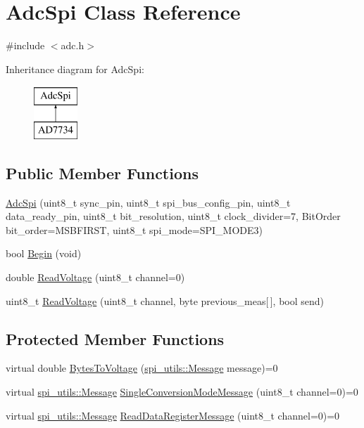 \hypertarget{classAdcSpi}{}\section{Adc\+Spi Class Reference}
\label{classAdcSpi}


{\ttfamily \#include $<$adc.\+h$>$}

Inheritance diagram for Adc\+Spi\+:\begin{figure}[H]
\begin{center}
\leavevmode
\includegraphics[height=2.000000cm]{classAdcSpi}
\end{center}
\end{figure}
\subsection*{Public Member Functions}
\begin{DoxyCompactItemize}
\item 
\mbox{\hyperlink{classAdcSpi_a3c66ca397c2a9d0a7c475ee551b3c388}{Adc\+Spi}} (uint8\+\_\+t sync\+\_\+pin, uint8\+\_\+t spi\+\_\+bus\+\_\+config\+\_\+pin, uint8\+\_\+t data\+\_\+ready\+\_\+pin, uint8\+\_\+t bit\+\_\+resolution, uint8\+\_\+t clock\+\_\+divider=7, Bit\+Order bit\+\_\+order=M\+S\+B\+F\+I\+R\+ST, uint8\+\_\+t spi\+\_\+mode=S\+P\+I\+\_\+\+M\+O\+D\+E3)
\item 
bool \mbox{\hyperlink{classAdcSpi_aa8f8f27578dd85cfcdbc9439bbce66cb}{Begin}} (void)
\item 
double \mbox{\hyperlink{classAdcSpi_ace8264acfedb357986afa5f611eff3ee}{Read\+Voltage}} (uint8\+\_\+t channel=0)
\item 
uint8\+\_\+t \mbox{\hyperlink{classAdcSpi_ac9d2ab924ad4de5b91713a22189f2ad0}{Read\+Voltage}} (uint8\+\_\+t channel, byte previous\+\_\+meas\mbox{[}$\,$\mbox{]}, bool send)
\end{DoxyCompactItemize}
\subsection*{Protected Member Functions}
\begin{DoxyCompactItemize}
\item 
virtual double \mbox{\hyperlink{classAdcSpi_a25a1deb55a9f0e71a405ca47a41f3804}{Bytes\+To\+Voltage}} (\mbox{\hyperlink{structspi__utils_1_1Message}{spi\+\_\+utils\+::\+Message}} message)=0
\item 
virtual \mbox{\hyperlink{structspi__utils_1_1Message}{spi\+\_\+utils\+::\+Message}} \mbox{\hyperlink{classAdcSpi_a369da36232861640a113792d2398ce44}{Single\+Conversion\+Mode\+Message}} (uint8\+\_\+t channel=0)=0
\item 
virtual \mbox{\hyperlink{structspi__utils_1_1Message}{spi\+\_\+utils\+::\+Message}} \mbox{\hyperlink{classAdcSpi_a3578f18e1976d9e2b075a3fbdc003517}{Read\+Data\+Register\+Message}} (uint8\+\_\+t channel=0)=0
\end{DoxyCompactItemize}


